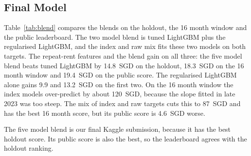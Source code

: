 \subsection{Final Model}

Table~\ref{tab:blend} compares the blends on the holdout, the 16 month window and the public leaderboard. The two model blend is tuned LightGBM plus the regularised LightGBM, and the index and raw mix fits these two models on both targets. The repeat-rent features and the blend gain on all three: the five model blend beats tuned LightGBM by 14.8~SGD on the holdout, 18.3~SGD on the 16 month window and 19.4~SGD on the public score. The regularised LightGBM alone gains 9.9 and 13.2~SGD on the first two. On the 16 month window the index models over-predict by about 120~SGD, because the slope fitted in late 2023 was too steep. The mix of index and raw targets cuts this to 87~SGD and has the best 16 month score, but its public score is 4.6~SGD worse.

\begin{table}[htbp]
\caption{RMSE (SGD) of single models and blends, with the index target unless stated.}
\label{tab:blend}
\centering
\footnotesize

\end{table}

The five model blend is our final Kaggle submission, because it has the best holdout score. Its public score is also the best, so the leaderboard agrees with the holdout ranking.
